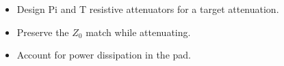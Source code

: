 \begin{objectives}
\begin{itemize}[leftmargin=1.4em,itemsep=2pt]
\item Design Pi and T resistive attenuators for a target attenuation.
\item Preserve the $Z_0$ match while attenuating.
\item Account for power dissipation in the pad.
\end{itemize}
\end{objectives}
